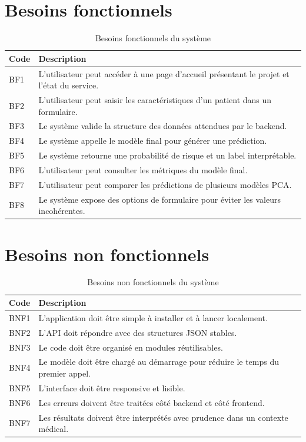 \documentclass[12pt,a4paper]{report}
\begin{document}
\section{Besoins fonctionnels}
\begin{longtable}{p{3cm}p{10cm}}
\caption{Besoins fonctionnels du système}\\
\toprule
\textbf{Code} & \textbf{Description}\\
\midrule
BF1 & L'utilisateur peut accéder à une page d'accueil présentant le projet et l'état du service.\\
BF2 & L'utilisateur peut saisir les caractéristiques d'un patient dans un formulaire.\\
BF3 & Le système valide la structure des données attendues par le backend.\\
BF4 & Le système appelle le modèle final pour générer une prédiction.\\
BF5 & Le système retourne une probabilité de risque et un label interprétable.\\
BF6 & L'utilisateur peut consulter les métriques du modèle final.\\
BF7 & L'utilisateur peut comparer les prédictions de plusieurs modèles PCA.\\
BF8 & Le système expose des options de formulaire pour éviter les valeurs incohérentes.\\
\bottomrule
\end{longtable}

\section{Besoins non fonctionnels}
\begin{longtable}{p{3cm}p{10cm}}
\caption{Besoins non fonctionnels du système}\\
\toprule
\textbf{Code} & \textbf{Description}\\
\midrule
BNF1 & L'application doit être simple à installer et à lancer localement.\\
BNF2 & L'API doit répondre avec des structures JSON stables.\\
BNF3 & Le code doit être organisé en modules réutilisables.\\
BNF4 & Le modèle doit être chargé au démarrage pour réduire le temps du premier appel.\\
BNF5 & L'interface doit être responsive et lisible.\\
BNF6 & Les erreurs doivent être traitées côté backend et côté frontend.\\
BNF7 & Les résultats doivent être interprétés avec prudence dans un contexte médical.\\
\bottomrule
\end{longtable}
\end{document}
